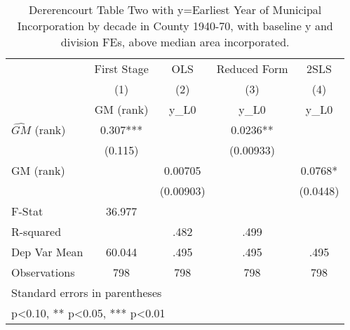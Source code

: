 \begin{table}[htbp]\centering
\def\sym#1{\ifmmode^{#1}\else\(^{#1}\)\fi}
\caption{Dererencourt Table Two with y=Earliest Year of Municipal Incorporation by decade in County 1940-70, with baseline y and division FEs, above median area incorporated.}
\begin{tabular}{l*{4}{c}}
\toprule
                    & First Stage   &         OLS   &Reduced Form   &        2SLS   \\
                    &\multicolumn{1}{c}{(1)}&\multicolumn{1}{c}{(2)}&\multicolumn{1}{c}{(3)}&\multicolumn{1}{c}{(4)}\\
                    &\multicolumn{1}{c}{GM  (rank)}&\multicolumn{1}{c}{y\_L0}&\multicolumn{1}{c}{y\_L0}&\multicolumn{1}{c}{y\_L0}\\
\midrule
$\hat{GM}$ (rank)   &       0.307***&               &      0.0236** &               \\
                    &     (0.115)   &               &   (0.00933)   &               \\
\addlinespace
GM  (rank)          &               &     0.00705   &               &      0.0768*  \\
                    &               &   (0.00903)   &               &    (0.0448)   \\
\midrule
F-Stat              &      36.977   &               &               &               \\
R-squared           &               &        .482   &        .499   &               \\
Dep Var Mean        &      60.044   &        .495   &        .495   &        .495   \\
Observations        &         798   &         798   &         798   &         798   \\
\bottomrule
\multicolumn{5}{l}{\footnotesize Standard errors in parentheses}\\
\multicolumn{5}{l}{\footnotesize * p<0.10, ** p<0.05, *** p<0.01}\\
\end{tabular}
\end{table}
